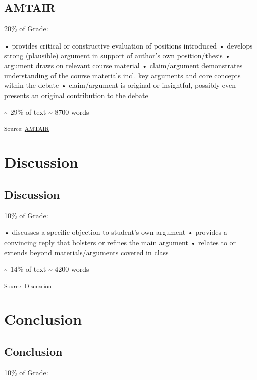 \documentclass[12pt,a4paper]{report}      %
\begin{document}
\section{AMTAIR}\label{amtair-1}

20\% of Grade:

• provides critical or constructive evaluation of positions introduced •
develops strong (plausible) argument in support of author's own
position/thesis • argument draws on relevant course material •
claim/argument demonstrates understanding of the course materials incl.
key arguments and core concepts within the debate • claim/argument is
original or insightful, possibly even presents an original contribution
to the debate

\textasciitilde{} 29\% of text \textasciitilde{} 8700 words

\textsubscript{Source:
\href{https://VJMeyer.github.io/submission/chapters/AMTAIR.qmd.html\#050f6e6a-d523-40ce-ab7d-0063dfb6e0d0}{AMTAIR}}

\chapter{Discussion}\label{discussion}

\section{Discussion}\label{discussion-1}

10\% of Grade:

• discusses a specific objection to student's own argument • provides a
convincing reply that bolsters or refines the main argument • relates to
or extends beyond materials/arguments covered in class

\textasciitilde{} 14\% of text \textasciitilde{} 4200 words

\textsubscript{Source:
\href{https://VJMeyer.github.io/submission/chapters/Discussion.qmd.html\#6a205f09-6bca-40a9-a723-98d31e3907f4}{Discussion}}

\chapter{Conclusion}\label{conclusion}

\section{Conclusion}\label{conclusion-1}

10\% of Grade:
\end{document}
